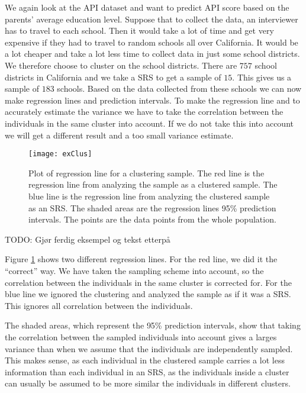 \documentclass{article}
\begin{document}
\begin{example}
  We again look at the API dataset and want to predict API score based on
  the parents' average education level. Suppose that to collect the data, an
  interviewer has to travel to each school. Then it would take a lot of time and
  get very expensive if they had to travel to random schools all over
  California. It would be a lot cheaper and take a lot less time to
  collect data in just some school districts. We therefore choose to cluster
  on the school districts. There are \(757\) school districts in California and we take a SRS to
  get a sample of \(15\). This gives us a sample of \(183\) schools. Based on
  the data collected from these schools we can now make regression lines and
  prediction intervals.
  To make the regression line and to accurately estimate the variance we have to
  take the correlation between the individuals in the same cluster into account.
  If we do not take this into account we will get a different result and a too
  small variance estimate.

  \begin{figure}
    \centering
    \texttt{[image: exClus]}

    \caption{Plot of regression line for a clustering sample. The red line is
      the regression line from analyzing the sample as a clustered sample. The
      blue line is the regression line from analyzing the clustered sample as an
    SRS. The shaded areas are the regression lines 95\% prediction intervals.
    The points are the data points from the whole population.}

    \label{fig:exClus}
  \end{figure}

  TODO: Gjør ferdig eksempel og tekst etterpå

  Figure \ref{fig:exClus} shows two different regression lines. For the red line, we did it the ``correct'' way. We have taken
  the sampling scheme into account, so the correlation between the individuals
  in the same cluster is corrected for. For the blue line we ignored the
  clustering and analyzed the sample as if it was a SRS. This ignores all
  correlation between the individuals.

  The shaded areas, which represent the 95\% prediction intervals, show that
  taking the correlation between the sampled individuals into account gives a
  larges variance than when we assume that the individuals are independently sampled.
  This makes sense, as each
  individual in the clustered sample carries a lot less information than each
  individual in an SRS, as the individuals inside a cluster can usually be
  assumed to be more similar the individuals in different clusters.


\end{example}
\end{document}

